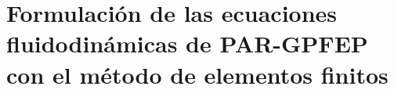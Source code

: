 \chapter{Formulación de las ecuaciones fluidodinámicas de \textbf{PAR-GPFEP} con el método de elementos finitos}\label{C:ap1}
